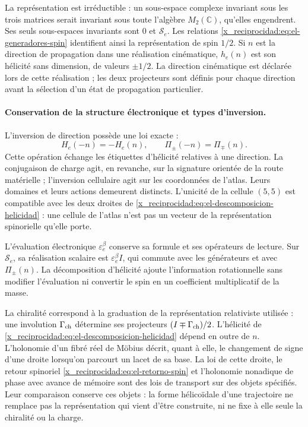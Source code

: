 La représentation est irréductible : un sous-espace complexe invariant sous
les trois matrices serait invariant sous toute l'algèbre \(M_2(\mathbb C)\),
qu'elles engendrent. Ses seuls sous-espaces invariants sont \(0\) et
\(\mathscr S_e\). Les relations
\eqref{x_reciprocidad:eq:el-generadores-spin} identifient ainsi la représentation de
spin \(1/2\). Si \(n\) est la direction de propagation dans une
réalisation cinématique, \(h_e(n)\) est son hélicité sans dimension, de
valeurs \(\pm1/2\). La direction cinématique est déclarée lors de cette
réalisation ; les deux projecteurs sont définis pour chaque direction
avant la sélection d'un état de propagation particulier.

\paragraph{Conservation de la structure électronique et types d'inversion.}
L'inversion de direction possède une loi exacte :
\[
 H_e(-n)=-H_e(n),\qquad \Pi_\pm(-n)=\Pi_\mp(n).
\]
Cette opération échange les étiquettes d'hélicité relatives à une
direction. La conjugaison de charge agit, en revanche, sur la signature
orientée de la route matérielle ; l'inversion cellulaire agit sur les
coordonnées de l'atlas. Leurs domaines et leurs actions demeurent distincts.
L'unicité de la cellule \((5,5)\) est compatible avec les deux droites de
\eqref{x_reciprocidad:eq:el-descomposicion-helicidad} : une cellule de l'atlas n'est pas un
vecteur de la représentation spinorielle qu'elle porte.

L'évaluation électronique \(\varepsilon_e^\beta\) conserve sa
formule et ses opérateurs de lecture. Sur \(\mathscr S_e\), sa réalisation scalaire
est \(\varepsilon_e^\beta I\), qui commute avec les générateurs et avec
\(\Pi_\pm(n)\). La décomposition d'hélicité ajoute l'information
rotationnelle sans modifier l'évaluation ni convertir le spin en un
coefficient multiplicatif de la masse.

La chiralité correspond à la graduation de la représentation relativiste
utilisée : une involution \(\Gamma_{\rm ch}\) détermine ses
projecteurs \((I\mp\Gamma_{\rm ch})/2\). L'hélicité de
\eqref{x_reciprocidad:eq:el-descomposicion-helicidad} dépend en outre de \(n\).
L'holonomie d'un fibré réel de Möbius décrit, quant à elle, le changement
de signe d'une droite lorsqu'on parcourt un lacet de sa base. La loi de cette droite,
le retour spinoriel \eqref{x_reciprocidad:eq:el-retorno-spin} et l'holonomie nonadique
de phase avec avance de mémoire sont des lois de transport sur des objets
spécifiés. Leur comparaison conserve ces objets : la forme hélicoïdale
d'une trajectoire ne remplace pas la représentation qui vient d'être
construite, ni ne fixe à elle seule la chiralité ou la charge.

